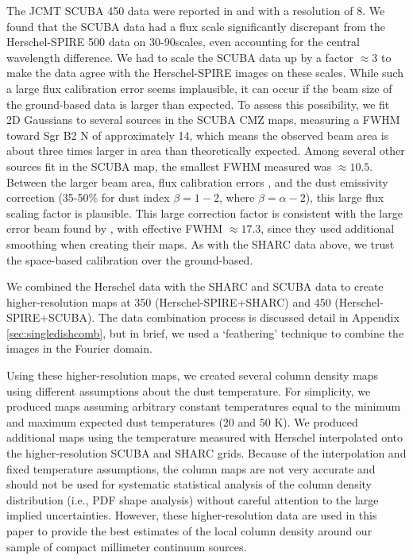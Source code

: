 \documentclass[twocolumn]{aastex61}
\newcommand{\percent}{\%\xspace}
\begin{document}
The JCMT SCUBA 450 \um data were reported in \citet{Pierce-Price2000a} and
\citet{di-Francesco2008a} with a resolution of 8\arcsec.  We found that the
SCUBA data had a flux scale significantly discrepant from the Herschel-SPIRE
500 \um data on 30-90\arcsec scales, even accounting for the central wavelength
difference.  We had to
scale the SCUBA data up by a factor $\approx3$ to make the data agree with
the Herschel-SPIRE images on these scales.  While such a large flux calibration
error seems implausible, it can occur if the beam size of the ground-based data
is larger than expected.  To assess this possibility, we fit 2D Gaussians to
several sources in the SCUBA CMZ maps, measuring a FWHM toward Sgr B2 N of
approximately 14\arcsec, which means the observed beam area is about three times larger
in area than theoretically expected.  Among several other sources fit in the
SCUBA map, the smallest FWHM measured was $\approx10.5$\arcsec.  Between the
larger beam area, flux
calibration errors \citep[quoted at 20\percent in][]{Pierce-Price2000a}, and
the dust emissivity correction (35-50\percent for dust index $\beta=1-2$, where
$\beta=\alpha-2$), this large flux
scaling factor is plausible. This large correction factor is consistent with
the large error beam found by \citet{di-Francesco2008a}, with effective FWHM
$\approx17.3$\arcsec, since they used additional smoothing when creating their
maps.  As with the SHARC data above, we trust the space-based calibration
over the ground-based.


We combined the Herschel data with the SHARC and SCUBA data to create
higher-resolution maps at 350 \um (Herschel-SPIRE+SHARC) and 450 \um
(Herschel-SPIRE+SCUBA).  The data combination process is discussed detail in
Appendix \ref{sec:singledishcomb}, but in brief, we used a `feathering'
technique \citep[e.g.,][]{Stanimirovic2002a,Cotton2017a} to combine the images
in the Fourier domain.


Using these higher-resolution maps, we created several column density maps
using different assumptions about the dust temperature.  For simplicity, we
produced maps assuming arbitrary constant temperatures equal to the minimum and
maximum expected dust temperatures (20 and 50 K). We produced additional maps
using the temperature measured with Herschel interpolated onto the
higher-resolution SCUBA and SHARC grids.  Because of the interpolation and
fixed temperature assumptions, the column maps are not very accurate and should
not be used for systematic statistical analysis of the column density
distribution (i.e., PDF shape analysis) without careful attention to the large
implied uncertainties.  However, these higher-resolution data are used in this
paper to provide the best estimates of the local column density around our
sample of compact millimeter continuum sources.
\end{document}
